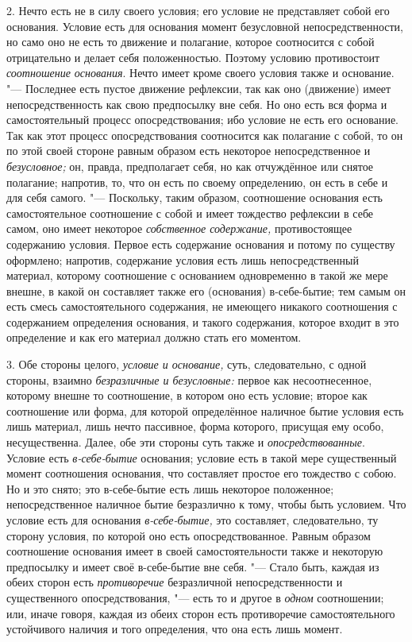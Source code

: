 2. Нечто есть не в силу своего условия; его условие не представляет собой
его основания. Условие есть для основания момент безусловной
непосредственности, но само оно не есть то движение и полагание, которое
соотносится с собой отрицательно и делает себя положенностью. Поэтому
условию противостоит {\em соотношение основания}. Нечто
имеет кроме своего условия также и основание. "--- Последнее есть пустое
движение рефлексии, так как оно (движение) имеет непосредственность как
свою предпосылку вне себя. Но оно есть вся форма и самостоятельный процесс
опосредствования; ибо условие не есть его основание. Так как этот процесс
опосредствования соотносится как полагание с собой, то он по этой своей
стороне равным образом есть некоторое непосредственное и
{\em безусловное;} он, правда, предполагает себя, но
как отчуждённое или снятое полагание; напротив, то, что он есть по своему
определению, он есть в себе и для себя самого. "--- Поскольку, таким образом,
соотношение основания есть самостоятельное соотношение с собой и имеет
тождество рефлексии в себе самом, оно имеет некоторое
{\em собственное содержание,} противостоящее содержанию
условия. Первое есть содержание основания и потому по существу оформлено;
напротив, содержание условия есть лишь непосредственный материал, которому
соотношение с основанием одновременно в такой же мере внешне, в какой он
составляет также его (основания) в-себе-бытие; тем самым он есть смесь
самостоятельного содержания, не имеющего никакого соотношения с содержанием
определения основания, и такого содержания, которое входит в это
определение и как его материал должно стать его моментом.

3. Обе стороны целого, {\em условие и основание,} суть,
следовательно, с одной стороны, взаимно
{\em безразличные и безусловные:} первое как
несоотнесенное, которому внешне то соотношение, в котором оно есть условие;
второе как соотношение или форма, для которой определённое наличное бытие
условия есть лишь материал, лишь нечто пассивное, форма которого, присущая
ему особо, несущественна. Далее, обе эти стороны суть также и
{\em опосредствованные}. Условие есть
{\em в-себе-бытие} основания; условие есть в такой мере
существенный момент соотношения основания, что составляет простое его
тождество с собою. Но и это снято; это в-себе-бытие есть лишь некоторое
положенное; непосредственное наличное бытие безразлично к тому, чтобы быть
условием. Что условие есть для основания
{\em в-себе-бытие,} это составляет, следовательно, ту
сторону условия, по которой оно есть опосредствованное. Равным образом
соотношение основания имеет в своей самостоятельности также и некоторую
предпосылку и имеет своё в-себе-бытие вне себя. "--- Стало быть, каждая из
обеих сторон есть {\em противоречие} безразличной
непосредственности и существенного опосредствования, "--- есть то и другое в
{\em одном} соотношении; или, иначе говоря, каждая из
обеих сторон есть противоречие самостоятельного устойчивого наличия и того
определения, что она есть лишь момент.

